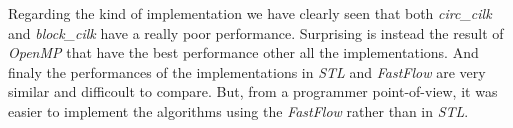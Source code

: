 \documentclass{article}
\begin{document}
\medskip

Regarding the kind of implementation we have clearly seen that both \textit{circ\_cilk} and \textit{block\_cilk} have a really poor performance. Surprising is instead the result of \textit{OpenMP} that have the best performance other all the implementations. And finaly the performances of the implementations in \textit{STL} and \textit{FastFlow} are very similar and difficoult to compare. But, from a programmer point-of-view, it was easier to implement the algorithms using the \textit{FastFlow} rather than in \textit{STL}.


\end{document}

